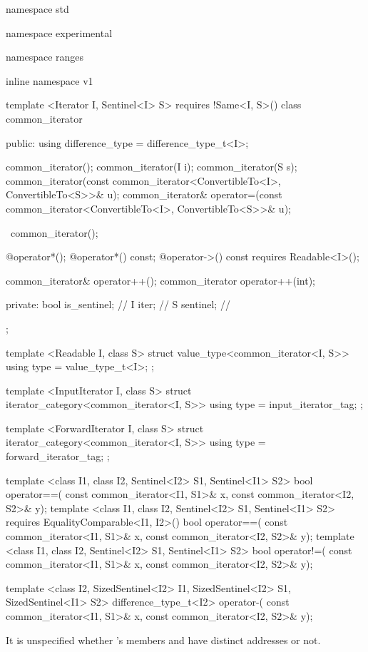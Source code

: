 %
\begin{codeblock}
namespace std { namespace experimental { namespace ranges { inline namespace v1 {
  template <Iterator I, Sentinel<I> S>
    requires !Same<I, S>()
  class common_iterator {
  public:
    using difference_type = difference_type_t<I>;

    common_iterator();
    common_iterator(I i);
    common_iterator(S s);
    common_iterator(const common_iterator<ConvertibleTo<I>, ConvertibleTo<S>>& u);
    common_iterator& operator=(const common_iterator<ConvertibleTo<I>, ConvertibleTo<S>>& u);

    ~common_iterator();

    @\seebelow@ operator*();
    @\seebelow@ operator*() const;
    @\seebelow@ operator->() const requires Readable<I>();

    common_iterator& operator++();
    common_iterator operator++(int);

  private:
    bool is_sentinel; // \expos
    I iter;           // \expos
    S sentinel;       // \expos
  };

  template <Readable I, class S>
  struct value_type<common_iterator<I, S>> {
    using type = value_type_t<I>;
  };

  template <InputIterator I, class S>
  struct iterator_category<common_iterator<I, S>> {
    using type = input_iterator_tag;
  };

  template <ForwardIterator I, class S>
  struct iterator_category<common_iterator<I, S>> {
    using type = forward_iterator_tag;
  };

  template <class I1, class I2, Sentinel<I2> S1, Sentinel<I1> S2>
  bool operator==(
    const common_iterator<I1, S1>& x, const common_iterator<I2, S2>& y);
  template <class I1, class I2, Sentinel<I2> S1, Sentinel<I1> S2>
    requires EqualityComparable<I1, I2>()
  bool operator==(
    const common_iterator<I1, S1>& x, const common_iterator<I2, S2>& y);
  template <class I1, class I2, Sentinel<I2> S1, Sentinel<I1> S2>
  bool operator!=(
    const common_iterator<I1, S1>& x, const common_iterator<I2, S2>& y);

  template <class I2, SizedSentinel<I2> I1, SizedSentinel<I2> S1, SizedSentinel<I1> S2>
  difference_type_t<I2> operator-(
    const common_iterator<I1, S1>& x, const common_iterator<I2, S2>& y);
}}}}
\end{codeblock}

\pnum
\enternote It is unspecified whether 's members
 and  have distinct addresses or not.\exitnote

